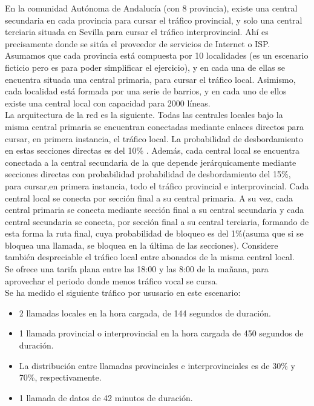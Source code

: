 \begin{exercise}[11]
En la comunidad Autónoma de Andalucía (con 8 provincia), existe una central secundaria en cada provincia para cursar el tráfico provincial, y solo una central terciaria situada en Sevilla para cursar el tráfico interprovincial. Ahí es precisamente donde se sitúa el proveedor de servicios de Internet o ISP. Asumamos que cada provincia está compuesta por 10 localidades (es un escenario ficticio pero es para poder simplificar el ejercicio), y en cada una de ellas se encuentra situada una central primaria, para cursar el tráfico local. Asimismo, cada localidad está formada por una serie de barrios, y en cada uno de ellos existe una central local con capacidad para 2000 líneas.\\
La arquitectura de la red es la siguiente. Todas las centrales locales bajo la misma central primaria se encuentran conectadas mediante enlaces directos para cursar, en primera instancia, el tráfico local. La probabilidad de desbordamiento en estas secciones directas es del 10\% . Además, cada central local se encuentra conectada a la central secundaria de la que depende jerárquicamente mediante secciones directas con probabilidad probabilidad de desbordamiento del 15\%, para cursar,en primera instancia, todo el tráfico provincial e interprovincial. Cada central local se conecta por sección final a su central primaria. A su vez, cada central primaria se conecta mediante sección final a su central secundaria y cada central secundaria se conecta, por sección final a su central terciaria, formando de esta forma la ruta final, cuya probabilidad de bloqueo es del 1\%(asuma que si se bloquea una llamada, se bloquea en la última de las secciones). Considere también despreciable el tráfico local entre abonados de la misma central local.\\
Se ofrece una tarifa plana entre las 18:00 y las 8:00 de la mañana, para aprovechar el periodo donde menos tráfico vocal se cursa.\\
Se ha medido el siguiente tráfico por ususario en este escenario:
\begin{itemize}
\item 2 llamadas locales en la hora cargada, de 144 segundos de duración.
\item 1 llamada provincial o interprovincial en la hora cargada de 450 segundos de duración.
\item La distribución entre llamadas provinciales e interprovinciales es de 30\% y 70\%, respectivamente.
\item 1 llamada de datos de 42 minutos de duración.

\end{itemize}
\end{exercise}
